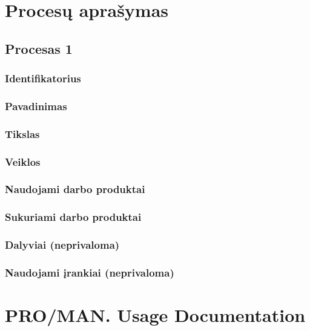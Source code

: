 \section{Procesų aprašymas}

\subsection{Procesas 1}

\subsubsection{Identifikatorius}
\subsubsection{Pavadinimas}
\subsubsection{Tikslas}
\subsubsection{Veiklos}

\subsubsection{Naudojami darbo produktai}
\subsubsection{Sukuriami darbo produktai}
\subsubsection{Dalyviai (neprivaloma)}
\subsubsection{Naudojami įrankiai (neprivaloma)}

\section{PRO/MAN. Usage Documentation}

